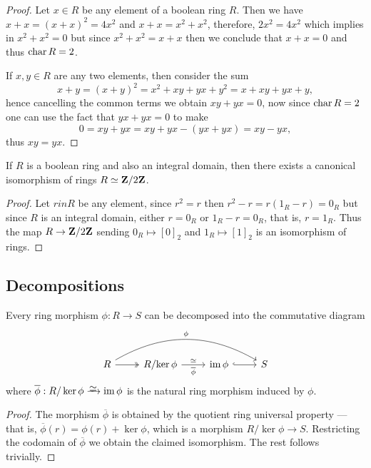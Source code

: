\begin{proof}
Let \(x \in R\) be any element of a boolean ring \(R\). Then we have
\(x + x = (x + x)^2 = 4 x^2\) and \(x + x = x^2 + x^2\), therefore,
\(2 x^2 = 4 x^2\) which implies in \(x^2 + x^2 = 0\) but since
\(x^2 + x^2 = x + x\) then we conclude that \(x + x = 0\) and thus
\(\operatorname{char} R = 2\).

If \(x, y \in R\) are any two elements, then consider the sum
\[
x + y
= (x + y)^2
= x^2 + x y + y x + y^2
= x + x y + y x + y,
\]
hence cancelling the common terms we obtain \(x y + y x = 0\), now since
\(\operatorname{char} R = 2\) one can use the fact that \(y x + yx = 0\) to make
\[
0 = x y + y x = x y + y x - (y x + y x) = x y - y x,
\]
thus \(x y = y x\).
\end{proof}

\begin{corollary}
\label{cor:boolean-integral-domain-is-Z/2Z}
If \(R\) is a boolean ring and also an integral domain, then there exists a
canonical isomorphism of rings \(R \simeq \mathbf{Z}/2\mathbf{Z}\).
\end{corollary}

\begin{proof}
Let \(r in R\) be any element, since \(r^2 = r\) then
\(r^2 - r = r(1_R - r) = 0_R\) but since \(R\) is an integral domain, either
\(r = 0_R\) or \(1_R - r = 0_R\), that is, \(r = 1_R\). Thus the map
\(R \to \mathbf{Z}/2\mathbf{Z}\) sending \(0_R \mapsto [0]_2\) and \(1_R \mapsto [1]_2\) is an
isomorphism of rings.
\end{proof}

\subsection{Decompositions}

\begin{theorem}
\label{thm:ring-first-isomorphism}
Every ring morphism \(\phi: R \to S\) can be decomposed into the commutative
diagram
\[
\begin{tikzcd}
R \ar[r, two heads] \ar[rrr, bend left, "\phi"]
&R/{\ker \phi} \ar[r, "\dis", "\overline{\phi}"']
&\im \phi \ar[r, hook]
&S
\end{tikzcd}
\]
where \(\overline{\phi}: R/\ker \phi \isoto \im \phi\) is the natural ring
morphism induced by \(\phi\).
\end{theorem}

\begin{proof}
The morphism \(\overline{\phi}\) is obtained by the quotient ring universal
property --- that is, \(\overline{\phi}(r) = \phi(r) + \ker \phi\), which is a
morphism \(R/{\ker \phi} \to S\). Restricting the codomain of
\(\overline{\phi}\) we obtain the claimed isomorphism. The rest follows
trivially.
\end{proof}

